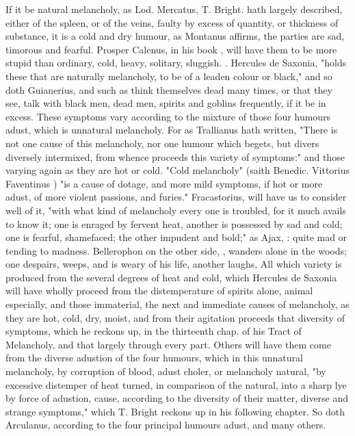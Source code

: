 {If it be natural melancholy, as Lod. Mercatus,  T. Bright.  hath largely
described, either of the spleen, or of the veins, faulty by excess of quantity,
or thickness of substance, it is a cold and dry humour, as Montanus affirms,
 the parties are sad, timorous and fearful.
Prosper Calenus, in his book , will have
them to be more stupid than ordinary, cold, heavy, solitary, sluggish. . Hercules de Saxonia,
 "holds these that are
naturally melancholy, to be of a leaden colour or black," and so doth
Guianerius,  and such as think
themselves dead many times, or that they see, talk with black men, dead men,
spirits and goblins frequently, if it be in excess. These symptoms vary
according to the mixture of those four humours adust, which is unnatural
melancholy. For as Trallianus hath written,  "There is not one cause of this melancholy, nor one
humour which begets, but divers diversely intermixed, from whence proceeds this
variety of symptoms:" and those varying again as they are hot or cold.
"Cold melancholy" (saith Benedic. Vittorius Faventinus
) "is a cause of dotage, and more mild
symptoms, if hot or more adust, of more violent passions, and furies."
Fracastorius,  will have us to
consider well of it, "with what kind of melancholy every
one is troubled, for it much avails to know it; one is enraged by fervent heat,
another is possessed by sad and cold; one is fearful, shamefaced; the other
impudent and bold;" as Ajax, : quite mad or tending to madness. 
Bellerophon on the other side, , wanders
alone in the woods; one despairs, weeps, and is weary of his life, another
laughs, \etc{} All which variety is produced from the several degrees of heat
and cold, which Hercules de Saxonia will have wholly
proceed from the distemperature of spirits alone, animal especially, and those
immaterial, the next and immediate causes of melancholy, as they are hot, cold,
dry, moist, and from their agitation proceeds that diversity of symptoms, which
he reckons up, in the thirteenth chap. of his Tract of
Melancholy, and that largely through every part. Others will have them come
from the diverse adustion of the four humours, which in this unnatural
melancholy, by corruption of blood, adust choler, or melancholy natural,
"by excessive distemper of heat turned, in comparison of
the natural, into a sharp lye by force of adustion, cause, according to the
diversity of their matter, diverse and strange symptoms," which T. Bright
reckons up in his following chapter. So doth Arculanus,
according to the four principal humours adust, and many others.

}
